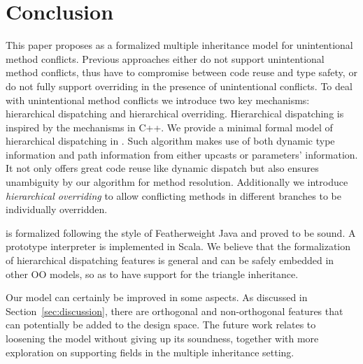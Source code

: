 \section{Conclusion}


This paper proposes \MIM{} as a formalized multiple inheritance model for
unintentional method conflicts. Previous approaches 
either do not support unintentional method conflicts, thus have to
compromise between code reuse and type safety, or do not fully support
overriding in the presence of unintentional conflicts. To deal with unintentional method conflicts we
introduce two key mechanisms: hierarchical dispatching and
hierarchical overriding. Hierarchical dispatching is inspired by the
mechanisms in C++. We provide a minimal formal model of hierarchical
dispatching in \MIM{}. Such algorithm makes use of both dynamic type
information and path information from either upcasts or parameters'
information. It not only offers great code reuse like
dynamic dispatch but also ensures unambiguity by our algorithm for
method resolution. Additionally we introduce \emph{hierarchical
  overriding} to allow conflicting methods in different branches to be
individually overridden.

\MIM{} is formalized following the style of
Featherweight Java and proved to be sound. A prototype interpreter is
implemented in Scala. We believe that the formalization of
hierarchical dispatching features is general and
can be safely embedded in other OO models, so as to have support for the triangle
inheritance.

Our model can certainly be improved in some aspects. 
As discussed in Section~\ref{sec:discussion}, there are orthogonal and
non-orthogonal features that can potentially be added to the design space. 
The future work relates to loosening the model without giving up its soundness,
together with more exploration on supporting fields in the multiple inheritance setting.

